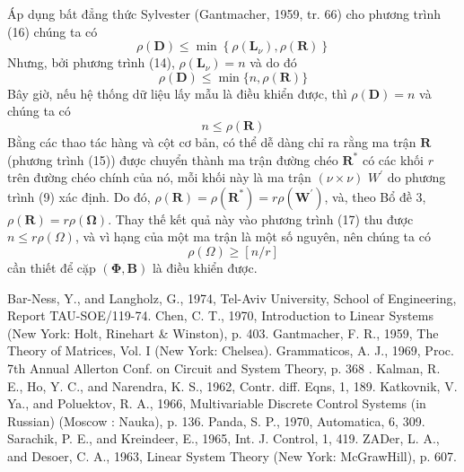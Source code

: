 \documentclass[12pt,a4paper]{article}
\begin{document}
Áp dụng bất đẳng thức Sylvester (Gantmacher, 1959, tr. 66) cho phương trình (16) chúng ta có
$$
\rho(\mathbf{D}) \leqslant \min \left\{\rho\left(\mathbf{L}_\nu\right), \rho(\mathbf{R})\right\}
$$
Nhưng, bởi phương trình (14), $\rho\left(\mathbf{L}_\nu\right)=n$ và do đó
$$
\rho(\mathbf{D}) \leqslant \min \{n, \rho(\mathbf{R})\}
$$
Bây giờ, nếu hệ thống dữ liệu lấy mẫu là điều khiển được, thì $\rho(\mathbf{D})=n$ và chúng ta có
\begin{equation}\tag{17}
	n \leqslant \rho(\mathbf{R})
\end{equation}
Bằng các thao tác hàng và cột cơ bản, có thể dễ dàng chỉ ra rằng ma trận $\mathbf{R}$ (phương trình (15)) được chuyển thành ma trận đường chéo $\mathbf{R}^*$ có các khối $r$ trên đường chéo chính của nó, mỗi khối này là ma trận $(\nu \times \nu)$ $W^{\prime}$ do phương trình (9) xác định. Do đó, $\rho(\mathbf{R})=\rho\left(\mathbf{R}^*\right)=r \rho\left(\mathbf{W}^{\prime}\right)$, và, theo Bổ đề 3, $\rho(\mathbf{R})=r \rho(\boldsymbol{\Omega})$. Thay thế kết quả này vào phương trình (17) thu được $n \leqslant r \rho(\Omega)$, và vì hạng của một ma trận là một số nguyên, nên chúng ta có
$$
\rho(\Omega) \geqslant[n / r]
$$
cần thiết để cặp $(\boldsymbol{\Phi}, \mathbf{B})$ là điều khiển được.

\begin{thebibliography}{99}
 Bar-Ness, Y., and Langholz, G., 1974, Tel-Aviv University, School of Engineering, Report TAU-SOE/119-74.
 Chen, C. T., 1970, Introduction to Linear Systems (New York: Holt, Rinehart \& Winston), p. 403.
 Gantmacher, F. R., 1959, The Theory of Matrices, Vol. I (New York: Chelsea).
 Grammaticos, A. J., 1969, Proc. 7th Annual Allerton Conf. on Circuit and System Theory, p. 368 .
 Kalman, R. E., Ho, Y. C., and Narendra, K. S., 1962, Contr. diff. Eqns, 1, 189. Katkovnik, V. Ya., and Poluektov, R. A., 1966, Multivariable Discrete Control Systems (in Russian) (Moscow : Nauka), p. 136.
 Panda, S. P., 1970, Automatica, 6, 309.
 Sarachik, P. E., and Kreindeer, E., 1965, Int. J. Control, 1, 419.
 ZADer, L. A., and Desoer, C. A., 1963, Linear System Theory (New York: McGrawHill), p. 607.
\end{thebibliography}
\end{document}
